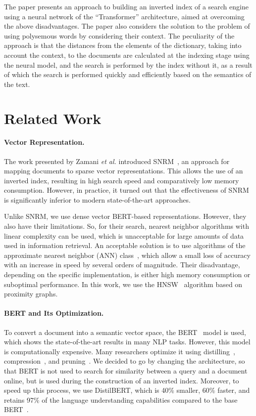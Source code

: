 \documentclass[
    twocolumn,
]{template/ceurart}
\begin{document}
    The paper presents an approach to building an inverted index of a search engine using a neural network
    of the ``Transformer'' architecture, aimed at overcoming the above disadvantages.
    The paper also considers the solution to the problem of using polysemous words by considering their context.
    The peculiarity of the approach is that the distances from the elements of the dictionary,
    taking into account the context, to the documents are calculated at the indexing stage using the neural model,
    and the search is performed by the index without it, as a result of which the search is performed quickly
    and efficiently based on the semantics of the text.


    \section{Related Work}

    \paragraph{Vector Representation.}
    The work presented by Zamani \textit{et al.} introduced SNRM~\cite{snrm},
    an approach for mapping documents to sparse vector representations.
    This allows the use of an inverted index, resulting in high search speed and comparatively low memory consumption.
    However, in practice, it turned out that the effectiveness of SNRM is significantly
    inferior to modern state-of-the-art approaches.

    Unlike SNRM, we use dense vector BERT-based representations.
    However, they also have their limitations.
    So, for their search, nearest neighbor algorithms with linear complexity can be used,
    which is unacceptable for large amounts of data used in information retrieval.
    An acceptable solution is to use algorithms of the approximate nearest neighbor (ANN) class~\cite{ann},
    which allow a small loss of accuracy with an increase in speed by several orders of magnitude.
    Their disadvantage, depending on the specific implementation,
    is either high memory consumption or suboptimal performance.
    In this work, we use the HNSW~\cite{hnsw} algorithm based on proximity graphs.

    \paragraph{BERT and Its Optimization.}
    To convert a document into a semantic vector space, the BERT~\cite{devlin2018bert} model is used,
    which shows the state-of-the-art results in many NLP tasks.
    However, this model is computationally expensive.
    Many researchers optimize it using distilling~\cite{bertDistilling},
    compression~\cite{bertCompression}, and pruning~\cite{bertPruning}.
    We decided to go by changing the architecture, so that BERT is not used to search for
    similarity between a query and a document online, but is used during the construction of an inverted index.
    Moreover, to speed up this process, we use DistilBERT, which is 40\% smaller, 60\% faster,
    and retains 97\% of the language understanding capabilities compared to the base BERT~\cite{bertDistilling}.
\end{document}
